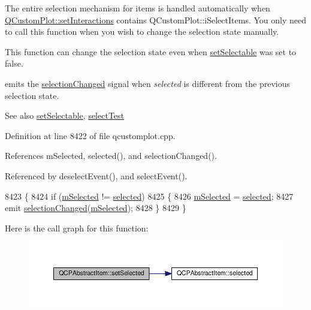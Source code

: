 The entire selection mechanism for items is handled automatically when \hyperlink{class_q_custom_plot_a5ee1e2f6ae27419deca53e75907c27e5}{Q\+Custom\+Plot\+::set\+Interactions} contains Q\+Custom\+Plot\+::i\+Select\+Items. You only need to call this function when you wish to change the selection state manually.

This function can change the selection state even when \hyperlink{class_q_c_p_abstract_item_a8a8e32a55bc478b849756a78c2d87fd2}{set\+Selectable} was set to false.

emits the \hyperlink{class_q_c_p_abstract_item_aa5cffb034fc65dbb91c77e02c1c14251}{selection\+Changed} signal when {\itshape selected} is different from the previous selection state.

\begin{DoxySeeAlso}{See also}
\hyperlink{class_q_c_p_abstract_item_a8a8e32a55bc478b849756a78c2d87fd2}{set\+Selectable}, \hyperlink{class_q_c_p_abstract_item_a96d522d10ffc0413b9a366c6f7f0476b}{select\+Test} 
\end{DoxySeeAlso}


Definition at line 8422 of file qcustomplot.\+cpp.



References m\+Selected, selected(), and selection\+Changed().



Referenced by deselect\+Event(), and select\+Event().


\begin{DoxyCode}
8423 \{
8424   \textcolor{keywordflow}{if} (\hyperlink{class_q_c_p_abstract_item_a4bdb3457dad1d268c0f78a44152b9645}{mSelected} != \hyperlink{class_q_c_p_abstract_item_a225865808640d8d9a7dd19f09a2e93f2}{selected})
8425   \{
8426     \hyperlink{class_q_c_p_abstract_item_a4bdb3457dad1d268c0f78a44152b9645}{mSelected} = \hyperlink{class_q_c_p_abstract_item_a225865808640d8d9a7dd19f09a2e93f2}{selected};
8427     emit \hyperlink{class_q_c_p_abstract_item_aa5cffb034fc65dbb91c77e02c1c14251}{selectionChanged}(\hyperlink{class_q_c_p_abstract_item_a4bdb3457dad1d268c0f78a44152b9645}{mSelected});
8428   \}
8429 \}
\end{DoxyCode}


Here is the call graph for this function\+:\nopagebreak
\begin{figure}[H]
\begin{center}
\leavevmode
\includegraphics[width=350pt]{class_q_c_p_abstract_item_a203de94ad586cc44d16c9565f49d3378_cgraph}
\end{center}
\end{figure}




